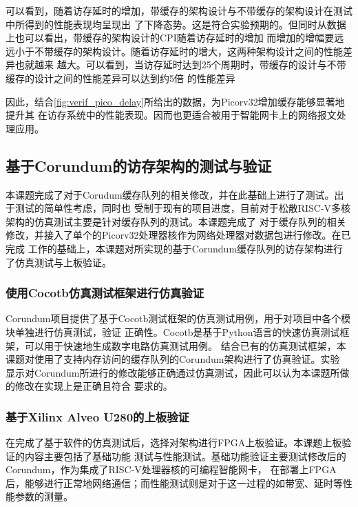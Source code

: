 可以看到，随着访存延时的增加，带缓存的架构设计与不带缓存的架构设计在测试中所得到的性能表现均呈现出
了下降态势。这是符合实验预期的。但同时从数据上也可以看出，带缓存的架构设计的CPI随着访存延时的增加
而增加的增幅要远远小于不带缓存的架构设计。随着访存延时的增大，这两种架构设计之间的性能差异也就越来
越大。可以看到，当访存延时达到25个周期时，带缓存的设计与不带缓存的设计之间的性能差异可以达到约5倍
的性能差异

因此，结合\autoref{fig:verif_pico_delay}所给出的数据，为Picorv32增加缓存能够显著地提升其
在访存系统中的性能表现。因而也更适合被用于智能网卡上的网络报文处理应用。

\subsection{基于Corundum的访存架构的测试与验证}

本课题完成了对于Corudum缓存队列的相关修改，并在此基础上进行了测试。出于测试的简单性考虑，同时也
受制于现有的项目进度，目前对于松散RISC-V多核架构的仿真测试主要是针对缓存队列的测试。本课题完成了
对于缓存队列的相关修改，并接入了单个的Picorv32处理器核作为网络处理器对数据包进行修改。在已完成
工作的基础上，本课题对所实现的基于Corundum缓存队列的访存架构进行了仿真测试与上板验证。

\subsubsection{使用Cocotb仿真测试框架进行仿真验证}

Corundum项目提供了基于Cocotb测试框架的仿真测试用例，用于对项目中各个模块单独进行仿真测试，验证
正确性。Cocotb是基于Python语言的快速仿真测试框架，可以用于快速地生成数字电路仿真测试用例\cite{cocotb_doc}。
结合已有的仿真测试框架，本课题对使用了支持内存访问的缓存队列的Corundum架构进行了仿真验证。实验
显示对Corundum所进行的修改能够正确通过仿真测试，因此可以认为本课题所做的修改在实现上是正确且符合
要求的。



\subsubsection{基于Xilinx Alveo U280的上板验证}

在完成了基于软件的仿真测试后，选择对架构进行FPGA上板验证。本课题上板验证的内容主要包括了基础功能
测试与性能测试。基础功能验证主要测试修改后的Corundum，作为集成了RISC-V处理器核的可编程智能网卡，
在部署上FPGA后，能够进行正常地网络通信；而性能测试则是对于这一过程的如带宽、延时等性能参数的测量。

